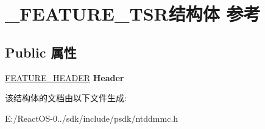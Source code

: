 \hypertarget{struct___f_e_a_t_u_r_e___t_s_r}{}\section{\+\_\+\+F\+E\+A\+T\+U\+R\+E\+\_\+\+T\+S\+R结构体 参考}
\label{struct___f_e_a_t_u_r_e___t_s_r}
\subsection*{Public 属性}
\begin{DoxyCompactItemize}
\item 
\mbox{\label{struct___f_e_a_t_u_r_e___t_s_r_a49f28b424282f1594caab5b6201b42ce}} 
\hyperlink{struct___f_e_a_t_u_r_e___h_e_a_d_e_r}{F\+E\+A\+T\+U\+R\+E\+\_\+\+H\+E\+A\+D\+ER} {\bfseries Header}
\end{DoxyCompactItemize}


该结构体的文档由以下文件生成\+:\begin{DoxyCompactItemize}
\item 
E\+:/\+React\+O\+S-\/0../sdk/include/psdk/ntddmmc.\+h\end{DoxyCompactItemize}
